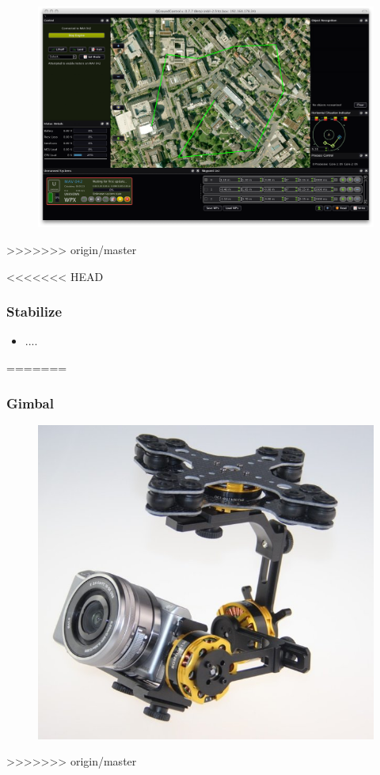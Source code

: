 \begin{frame}
\begin{itemize}
\begin{frame}
\begin{frame}
  \begin{figure}
  \includegraphics[scale=0.2]{pic/03_our-copter/qgroundcontrol.png}
  \end{figure}
>>>>>>> origin/master
  
\end{frame}



<<<<<<< HEAD

\begin{frame}
\frametitle{Stabilize}

  \begin{itemize}
    \item ....    
  \end{itemize}
=======
\begin{frame}
\frametitle{Gimbal}

  \begin{figure}
  \includegraphics[scale=0.4]{pic/03_our-copter/gimbal.jpg}
  \end{figure}
>>>>>>> origin/master
  

\end{frame}
\end{frame}
\end{frame}
\end{itemize}
\end{frame}
